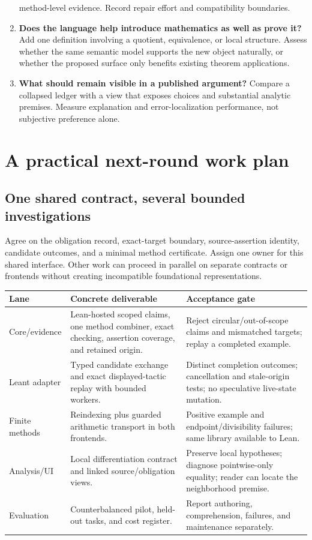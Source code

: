 \documentclass[11pt,letterpaper]{article}
\begin{document}
\begin{enumerate}[label=\textbf{Q\arabic*.},itemsep=.65em]
  method-level evidence. Record repair effort and compatibility boundaries.
\item \textbf{Does the language help introduce mathematics as well as prove it?}
  Add one definition involving a quotient, equivalence, or local structure.
  Assess whether the same semantic model supports the new object naturally,
  or whether the proposed surface only benefits existing theorem applications.
\item \textbf{What should remain visible in a published argument?}
  Compare a collapsed ledger with a view that exposes choices and substantial
  analytic premises. Measure explanation and error-localization performance,
  not subjective preference alone.
\end{enumerate}

\section{A practical next-round work plan}\label{sec:roadmap}
\subsection{One shared contract, several bounded investigations}
Agree on the obligation record, exact-target boundary, source-assertion identity,
candidate outcomes, and a minimal method certificate. Assign one owner for this
shared interface. Other work can proceed in parallel on separate contracts or
frontends without creating incompatible foundational representations.

\begin{tabularx}{\textwidth}{@{}P{.18\textwidth}YP{.27\textwidth}@{}}
\toprule
Lane & Concrete deliverable & Acceptance gate \\
\midrule
Core/evidence & Lean-hosted scoped claims, one method combiner, exact checking,
  assertion coverage, and retained origin. & Reject circular/out-of-scope claims
  and mismatched targets; replay a completed example.\\
Leant adapter & Typed candidate exchange and exact displayed-tactic replay with
  bounded workers. & Distinct completion outcomes; cancellation and stale-origin
  tests; no speculative live-state mutation.\\
Finite methods & Reindexing plus guarded arithmetic transport in both frontends.
  & Positive example and endpoint/divisibility failures; same library available
  to Lean.\\
Analysis/UI & Local differentiation contract and linked source/obligation views.
  & Preserve local hypotheses; diagnose pointwise-only equality; reader can
  locate the neighborhood premise.\\
Evaluation & Counterbalanced pilot, held-out tasks, and cost register.
  & Report authoring, comprehension, failures, and maintenance separately.\\
\bottomrule
\end{tabularx}
\end{document}
